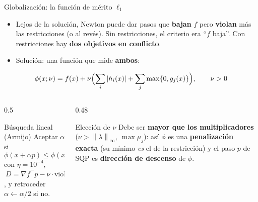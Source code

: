 \documentclass[aspectratio=169]{beamer}
\newcommand{\grad}{\nabla}
\newcommand{\norm}[1]{\left\lVert #1\right\rVert}
\begin{document}
\begin{frame}{Globalización: la función de mérito $\ell_1$}
  \begin{itemize}
    \item Lejos de la solución, Newton puede dar pasos que \textbf{bajan} $f$ pero \textbf{violan} más las restricciones (o al revés). Sin restricciones, el criterio era ``$f$ baja''. Con restricciones hay \textbf{dos objetivos en conflicto}.
    \item Solución: una función que mide \textbf{ambos}:
  \end{itemize}
  \[ \phi(x;\nu)=f(x)+\nu\Bigl(\sum_i|h_i(x)|+\sum_j\max\{0,g_j(x)\}\Bigr),\qquad \nu>0 \]
  \begin{columns}[T]
    \begin{column}{0.5\textwidth}
      \begin{block}{Búsqueda lineal (Armijo)}
        Aceptar $\alpha$ si
        \[ \phi(x+\alpha p)\le\phi(x)+\eta\,\alpha\,D, \]
        con $\eta=10^{-4}$, $\ D=\grad f^\top p-\nu\cdot\text{viol}(x)$, y retroceder $\alpha\leftarrow\alpha/2$ si no.
      \end{block}
    \end{column}
    \begin{column}{0.48\textwidth}
      \begin{block}{Elección de $\nu$}
        Debe ser \textbf{mayor que los multiplicadores} ($\nu>\norm{\lambda}_\infty,\ \max\mu_j$): así $\phi$ es una \textbf{penalización exacta} (su mínimo \emph{es} el de la restricción) y el paso $p$ de SQP es \textbf{dirección de descenso} de $\phi$.
      \end{block}
    \end{column}
  \end{columns}
\end{frame}
\end{document}
